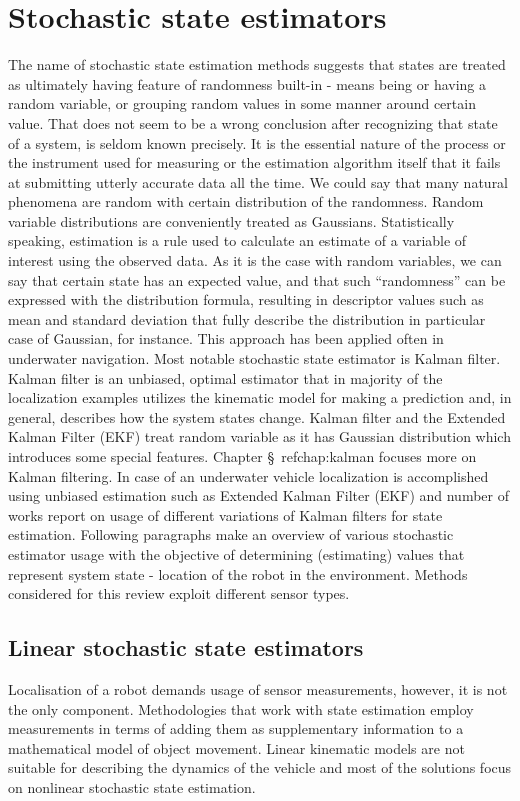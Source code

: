 \section{Stochastic state estimators}
The name of stochastic state estimation methods suggests that states are treated as ultimately having feature of randomness built-in - means being or having a random variable, or grouping random values in some manner around certain value. That does not seem to be a wrong conclusion after recognizing that state of a system, is seldom known precisely. It is the essential nature of the process or the instrument used for measuring or the estimation algorithm itself that it fails at submitting utterly accurate data all the time. We could say that many natural phenomena are random with certain distribution of the randomness. Random variable distributions are conveniently treated as Gaussians. Statistically speaking, estimation is a rule used to calculate an estimate of a variable of interest using the observed data. As it is the case with random variables, we can say that certain state has an expected value, and that such ``randomness'' can be expressed with the distribution formula, resulting in descriptor values such as mean and standard deviation that fully describe the distribution in particular case of Gaussian, for instance. This approach has been applied often in underwater navigation. Most notable stochastic state estimator is Kalman filter. Kalman filter is an unbiased, optimal estimator \cite{kalman60, grewal01} that in majority of the localization examples utilizes the kinematic model for making a prediction and, in general, describes how the system states change. Kalman filter and the Extended Kalman Filter (EKF) treat random variable as it has Gaussian distribution which introduces some special features. Chapter \S~ref{chap:kalman} focuses more on Kalman filtering. In case of an underwater vehicle localization is accomplished using unbiased estimation such as Extended Kalman Filter (EKF) and number of works report on usage of different variations of Kalman filters for state estimation. Following paragraphs make an overview of various stochastic estimator usage with the objective of determining (estimating) values that represent system state - location of the robot in the environment. Methods considered for this review exploit different sensor types.
\subsection{Linear stochastic state estimators}
Localisation of a robot demands usage of sensor measurements, however, it is not the only component. Methodologies that work with state estimation employ measurements in terms of adding them as supplementary information to a mathematical model of object movement. Linear kinematic models are not suitable for describing the dynamics of the vehicle and most of the solutions focus on nonlinear stochastic state estimation.   
